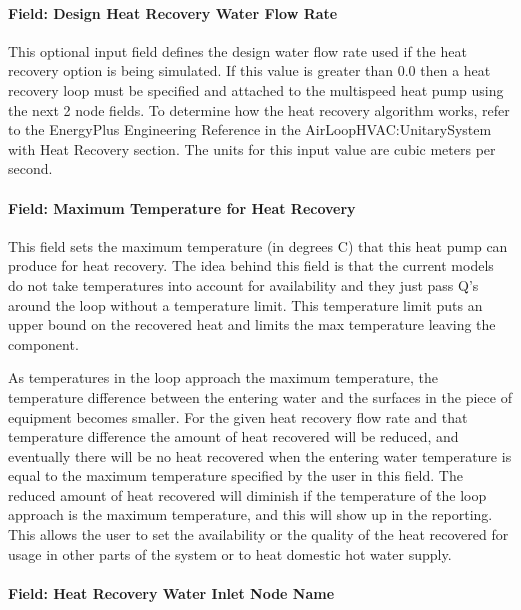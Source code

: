 \paragraph{Field: Design Heat Recovery Water Flow Rate}\label{field-design-heat-recovery-water-flow-rate-001}

This optional input field defines the design water flow rate used if the heat recovery option is being simulated. If this value is greater than 0.0 then a heat recovery loop must be specified and attached to the multispeed heat pump using the next 2 node fields. To determine how the heat recovery algorithm works, refer to the EnergyPlus Engineering Reference in the AirLoopHVAC:UnitarySystem with Heat Recovery section. The units for this input value are cubic meters per second.

\paragraph{Field: Maximum Temperature for Heat Recovery}\label{field-maximum-temperature-for-heat-recovery}

This field sets the maximum temperature (in degrees C) that this heat pump can produce for heat recovery. The idea behind this field is that the current models do not take temperatures into account for availability and they just pass Q's around the loop without a temperature limit. This temperature limit puts an upper bound on the recovered heat and limits the max temperature leaving the component.

As temperatures in the loop approach the maximum temperature, the temperature difference between the entering water and the surfaces in the piece of equipment becomes smaller. For the given heat recovery flow rate and that temperature difference the amount of heat recovered will be reduced, and eventually there will be no heat recovered when the entering water temperature is equal to the maximum temperature specified by the user in this field. The reduced amount of heat recovered will diminish if the temperature of the loop approach is the maximum temperature, and this will show up in the reporting. This allows the user to set the availability or the quality of the heat recovered for usage in other parts of the system or to heat domestic hot water supply.

\paragraph{Field: Heat Recovery Water Inlet Node Name}\label{field-heat-recovery-water-inlet-node-name-000}

